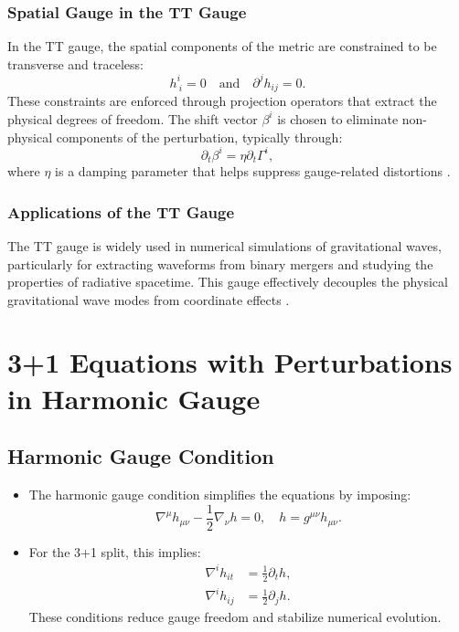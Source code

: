 \documentclass[12pt]{article}
\begin{document}
\subsubsection{Spatial Gauge in the TT Gauge}
In the TT gauge, the spatial components of the metric are constrained to be transverse and traceless:
\[
h^i_{\ i} = 0 \quad \text{and} \quad \partial^j h_{ij} = 0.
\]
These constraints are enforced through projection operators that extract the physical degrees of freedom. The shift vector $\beta^i$ is chosen to eliminate non-physical components of the perturbation, typically through:
\[
\partial_t \beta^i = \eta \partial_t \Gamma^i,
\]
where $\eta$ is a damping parameter that helps suppress gauge-related distortions \cite{alcubierre2003gauge}.

\subsubsection{Applications of the TT Gauge}
The TT gauge is widely used in numerical simulations of gravitational waves, particularly for extracting waveforms from binary mergers and studying the properties of radiative spacetime. This gauge effectively decouples the physical gravitational wave modes from coordinate effects \cite{baker2006gravitational,campanelli2006accurate}.


\section{3+1 Equations with Perturbations in Harmonic Gauge}

\subsection{Harmonic Gauge Condition}
\begin{itemize}
    \item The harmonic gauge condition simplifies the equations by imposing:
    \[
    \nabla^\mu h_{\mu\nu} - \frac{1}{2} \nabla_\nu h = 0, \quad h = g^{\mu\nu} h_{\mu\nu}.
    \]
    \item For the 3+1 split, this implies:
    \begin{align*}
        \nabla^i h_{it} &= \frac{1}{2} \partial_t h, \\
        \nabla^i h_{ij} &= \frac{1}{2} \partial_j h.
    \end{align*}
    These conditions reduce gauge freedom and stabilize numerical evolution.
\end{itemize}
\end{document}
